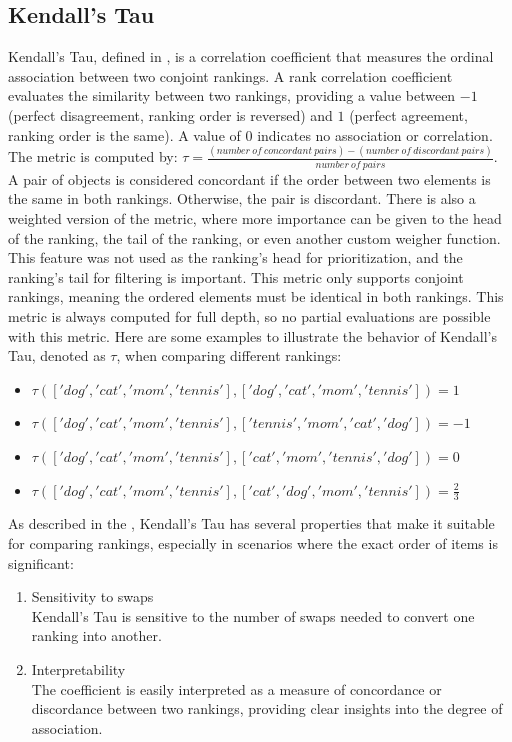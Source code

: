 \documentclass[draft,final]{thesisclass} %
\begin{document}
\subsection{Kendall's Tau} \label{kendalls_tau}
Kendall's Tau, defined in \textcite{kendall_tau}, is a correlation coefficient that measures the ordinal association between two conjoint rankings. A rank correlation coefficient evaluates the similarity between two rankings, providing a value between $-1$ (perfect disagreement, ranking order is reversed) and $1$ (perfect agreement, ranking order is the same). A value of $0$ indicates no association or correlation. The metric is computed by: $\tau = \frac{(number\:of\:concordant\:pairs)-(number\:of\:discordant\:pairs)}{number\:of\:pairs}$. A pair of objects is considered concordant if the order between two elements is the same in both rankings. Otherwise, the pair is discordant. There is also a weighted version of the metric, where more importance can be given to the head of the ranking, the tail of the ranking, or even another custom weigher function. This feature was not used as the ranking's head for prioritization, and the ranking's tail for filtering is important. This metric only supports conjoint rankings, meaning the ordered elements must be identical in both rankings. This metric is always computed for full depth, so no partial evaluations are possible with this metric. Here are some examples to illustrate the behavior of Kendall's Tau, denoted as $\tau$, when comparing different rankings:
\begin{itemize}
    \item $\tau(['dog', 'cat', 'mom', 'tennis'], ['dog', 'cat', 'mom', 'tennis']) = 1$
    \item $\tau(['dog', 'cat', 'mom', 'tennis'], ['tennis', 'mom', 'cat', 'dog']) = -1$
    \item $\tau(['dog', 'cat', 'mom', 'tennis'], ['cat', 'mom', 'tennis', 'dog']) = 0$
    \item $\tau(['dog', 'cat', 'mom', 'tennis'], ['cat', 'dog', 'mom', 'tennis']) = \frac{2}{3}$
\end{itemize}
As described in the \textcite[713-715]{kendall_tau}, Kendall's Tau has several properties that make it suitable for comparing rankings, especially in scenarios where the exact order of items is significant:
\begin{enumerate}
\item Sensitivity to swaps\\
Kendall's Tau is sensitive to the number of swaps needed to convert one ranking into another.
\item Interpretability\\
The coefficient is easily interpreted as a measure of concordance or discordance between two rankings, providing clear insights into the degree of association.
\end{enumerate}
\end{document}
